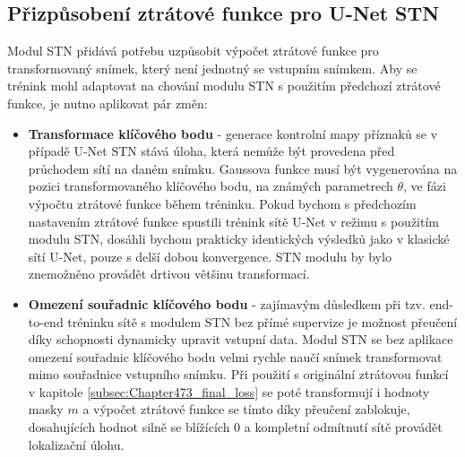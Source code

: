 \subsection{Přizpůsobení ztrátové funkce pro U-Net STN}
Modul STN přidává potřebu uzpůsobit výpočet ztrátové funkce pro transformovaný snímek, který není jednotný se vstupním snímkem. Aby se trénink mohl adaptovat na chování modulu STN s použitím předchozí ztrátové funkce, je nutno aplikovat pár změn:
\begin{itemize}
    \item \textbf{Transformace klíčového bodu} - generace kontrolní mapy příznaků se v případě U-Net STN stává úloha, která nemůže být provedena před průchodem sítí na daném snímku. Gaussova funkce musí být vygenerována na pozici transformovaného klíčového bodu, na známých parametrech $\theta$, ve fázi výpočtu ztrátové funkce během tréninku. Pokud bychom s předchozím nastavením ztrátové funkce spustili trénink sítě U-Net v režimu s použitím modulu STN, dosáhli bychom prakticky identických výsledků jako v klasické sítí U-Net, pouze s delší dobou konvergence. STN modulu by bylo znemožněno provádět drtivou většinu transformací.
    \item \textbf{Omezení souřadnic klíčového bodu} - zajímavým důsledkem při tzv. end-to-end tréninku sítě s modulem STN bez přímé supervize je možnost přeučení díky schopnosti dynamicky upravit vstupní data. Modul STN se bez aplikace omezení souřadnic klíčového bodu velmi rychle naučí snímek transformovat mimo souřadnice vstupního snímku. Při použití s originální ztrátovou funkcí v kapitole \ref{subsec:Chapter473_final_loss} se poté transformují i hodnoty masky $m$ a výpočet ztrátové funkce se tímto díky přeučení zablokuje, dosahujících hodnot silně se blížících 0 a kompletní odmítnutí sítě provádět lokalizační úlohu.
\end{itemize}



\endinput